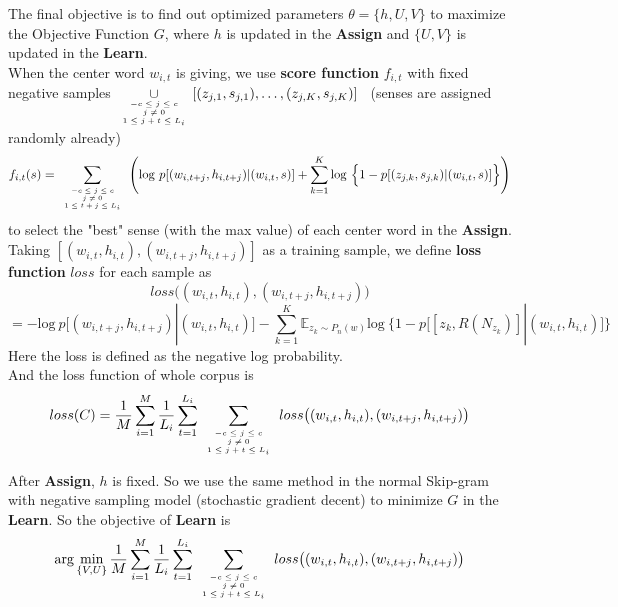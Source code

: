 \documentclass[12pt,a4paper,twoside]{book}
\begin{document}
The final objective is to find out optimized parameters $\theta = \{h,U,V\}$ to maximize the Objective Function $G$, where $h$ is updated in the \textbf{Assign} and $\{U,V\}$ is updated in the \textbf{Learn}.\\

When the center word $w_{i,t}$ is giving, we use \textbf{score function} $f_{i,t}$ with fixed negative samples $\displaystyle{\mathop{\cup}_{\mbox{\tiny$\begin{array}{c}-c\leq j \leq c\\ j\neq 0\\ 1\leq j+t\leq L_i\end{array}$}}}[(z_{j,1},s_{j,1}),\ldots,(z_{j,K},s_{j,K})]$ \ (senses are assigned randomly already)
$$f_{i,t}(s) = \sum\limits_{\mbox{\tiny$\begin{array}{c}-c\leq j \leq c\\ j\neq 0\\ 1\leq t+j\leq L_i\end{array}$}}\Bigg (\mathrm{log}\ p[(w_{i,t+j},h_{i,t+j})|(w_{i,t},s) ]+\sum\limits_{k=1}^K\mathrm{log}\ \Big \{1-p[(z_{j,k},s_{j,k})|(w_{i,t},s)] \Big \} \Bigg )$$ 
to select the "best" sense (with the max value) of each center word in the \textbf{Assign}. \\

Taking $[ (w_{i,t},h_{i,t}),(w_{i,t+j},h_{i,t+j})]$ as a training sample, we define \textbf{loss function} $loss$ for each sample as
$$loss\big ( (w_{i,t},h_{i,t}),(w_{i,t+j},h_{i,t+j})\big )$$
$$ = -\mathrm{log}\ p\Big [(w_{i,t+j},h_{i,t+j})|(w_{i,t},h_{i,t})\Big ]-\sum\limits_{k=1}^K\mathbb{E}_{z_k\sim P_n(w)}\mathrm{log}\ \Big \{1-p\Big[[z_k,R(N_{z_k})]|(w_{i,t},h_{i,t})\Big ] \Big \}$$
Here the loss is defined as the negative log probability. \\

And the loss function of whole corpus is $$loss(C)=\frac{1}{M}\sum_{i=1}^M\frac{1}{L_i}\sum_{t=1}^{L_i}\sum\limits_{\mbox{\tiny$\begin{array}{c}-c\leq j \leq c\\ j\neq 0\\ 1\leq j+t\leq L_i\end{array}$}}loss\big ( (w_{i,t},h_{i,t}),(w_{i,t+j},h_{i,t+j})\big )$$

	After \textbf{Assign}, $h$ is fixed. So we use the same method in the normal Skip-gram with negative sampling model (stochastic gradient decent) to minimize $G$ in the \textbf{Learn}. So the objective of \textbf{Learn} is 
	$$\arg\min_{\{V,U\}} \frac{1}{M}\sum_{i=1}^M\frac{1}{L_i}\sum_{t=1}^{L_i}\sum\limits_{\mbox{\tiny$\begin{array}{c}-c\leq j \leq c\\ j\neq 0\\ 1\leq j+t\leq L_i\end{array}$}}loss\big ( (w_{i,t},h_{i,t}),(w_{i,t+j},h_{i,t+j})\big )$$
	
\end{document}
